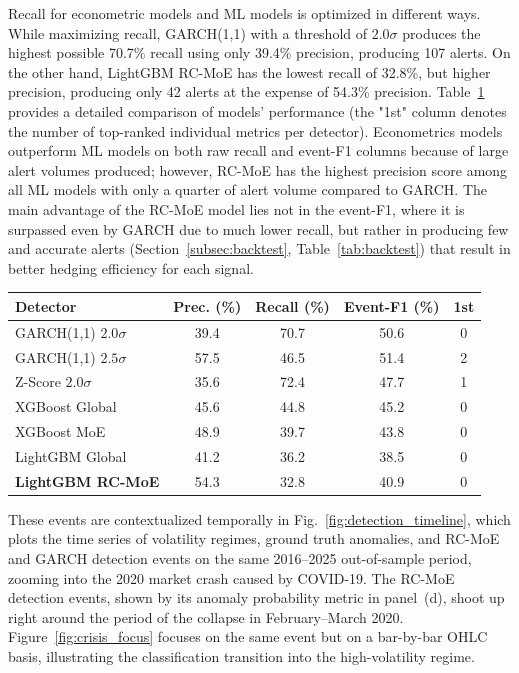 \documentclass[]{interact}
\begin{document}
Recall for econometric models and ML models is optimized in different ways. While maximizing recall, GARCH(1,1) with a threshold of $2.0\sigma$ produces the highest possible 70.7\% recall using only 39.4\% precision, producing 107 alerts. On the other hand, LightGBM RC-MoE has the lowest recall of 32.8\%, but higher precision, producing only 42 alerts at the expense of 54.3\% precision. Table~\ref{tab:oos_comparison} provides a detailed comparison of models' performance (the "1st" column denotes the number of top-ranked individual metrics per detector). Econometrics models outperform ML models on both raw recall and event-F1 columns because of large alert volumes produced; however, RC-MoE has the highest precision score among all ML models with only a quarter of alert volume compared to GARCH. The main advantage of the RC-MoE model lies not in the event-F1, where it is surpassed even by GARCH due to much lower recall, but rather in producing few and accurate alerts (Section~\ref{subsec:backtest}, Table~\ref{tab:backtest}) that result in better hedging efficiency for each signal.

\begin{table}[htbp]
{\small
\renewcommand{\arraystretch}{1.1}
\setlength{\tabcolsep}{4pt}
\begin{tabular}{lcccc}
\toprule
\textbf{Detector} & \textbf{Prec. (\%)} & \textbf{Recall (\%)} & \textbf{Event-F1 (\%)} & \textbf{1st} \\
\midrule
GARCH(1,1) $2.0\sigma$ & 39.4 & 70.7 & 50.6 & 0 \\
GARCH(1,1) $2.5\sigma$ & 57.5 & 46.5 & 51.4 & 2 \\
Z-Score $2.0\sigma$ & 35.6 & 72.4 & 47.7 & 1 \\
\midrule
XGBoost Global & 45.6 & 44.8 & 45.2 & 0 \\
XGBoost MoE & 48.9 & 39.7 & 43.8 & 0 \\
LightGBM Global & 41.2 & 36.2 & 38.5 & 0 \\
\textbf{LightGBM RC-MoE} & 54.3 & 32.8 & 40.9 & 0 \\
\bottomrule
\end{tabular}}
\label{tab:oos_comparison}
\end{table}

These events are contextualized temporally in Fig.~\ref{fig:detection_timeline}, which plots the time series of volatility regimes, ground truth anomalies, and RC-MoE and GARCH detection events on the same 2016--2025 out-of-sample period, zooming into the 2020 market crash caused by COVID-19. The RC-MoE detection events, shown by its anomaly probability metric in panel~(d), shoot up right around the period of the collapse in February--March 2020. Figure~\ref{fig:crisis_focus} focuses on the same event but on a bar-by-bar OHLC basis, illustrating the classification transition into the high-volatility regime.
\end{document}
